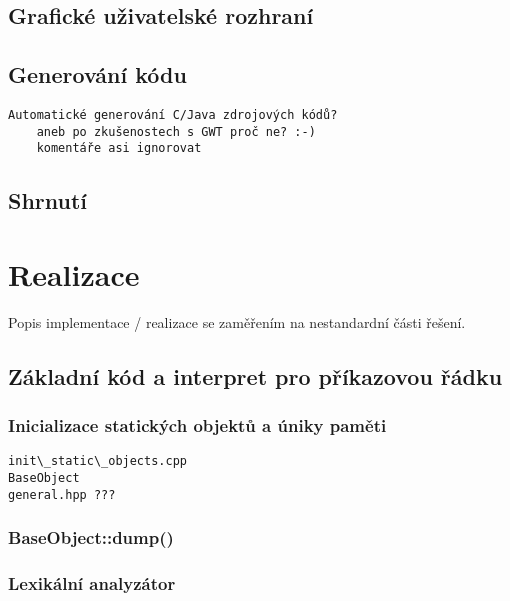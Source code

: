 \documentclass[11pt,twoside,a4paper]{book}
\begin{document}
\section{Grafické uživatelské rozhraní}


\section{Generování kódu}

\begin{verbatim}
Automatické generování C/Java zdrojových kódů?
	aneb po zkušenostech s GWT proč ne? :-)
	komentáře asi ignorovat
\end{verbatim}


\section{Shrnutí}




\chapter{Realizace}

Popis implementace / realizace se zaměřením na nestandardní části řešení.

\section{Základní kód a interpret pro příkazovou řádku}

\subsection{Inicializace statických objektů a úniky paměti}

\begin{verbatim}
init\_static\_objects.cpp
BaseObject
general.hpp ???
\end{verbatim}


\subsection{BaseObject::dump()}

\subsection{Lexikální analyzátor}
\end{document}
